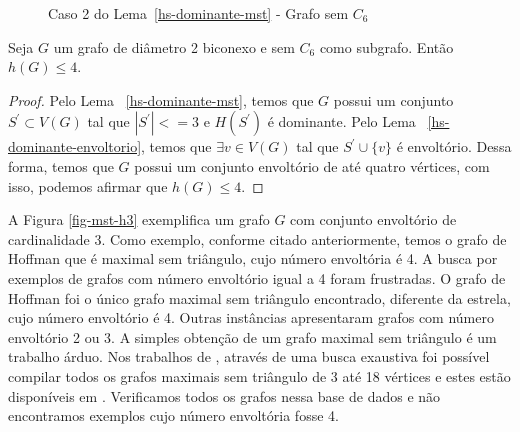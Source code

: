 \begin{figure}[h]
\centering
{}
\caption{Caso 2 do Lema~\ref{hs-dominante-mst} - Grafo sem $C_6$}
\label{fig-divisao-env-mst}
\end{figure}

\begin{coro}
    Seja $G$ um grafo de diâmetro 2 biconexo e sem $C_6$ como subgrafo. Então $h(G) \le 4$.
\label{teor-env-mst}
\end{coro}
\begin{proof}
    Pelo Lema ~\ref{hs-dominante-mst}, temos que $G$ possui um conjunto $S^\prime\subset V(G)$ tal que $|S^\prime|<=3$ e $H(S^\prime)$ é dominante. Pelo Lema ~\ref{hs-dominante-envoltorio}, temos que $\exists v \in V(G)$ tal que $S^\prime\cup\{v\}$ é envoltório. Dessa forma, temos que $G$ possui um conjunto envoltório de até quatro vértices, com isso, podemos afirmar que $h(G) \le 4$.
\end{proof}

A Figura \ref{fig-mst-h3} exemplifica um grafo $G$ com conjunto envoltório de cardinalidade 3. Como exemplo, conforme citado anteriormente, temos o grafo de Hoffman que é maximal sem triângulo, cujo número envoltória é 4. A busca por exemplos de grafos com número envoltório igual a 4 foram frustradas. O grafo de Hoffman foi o único grafo maximal sem triângulo encontrado, diferente da estrela,  cujo número envoltório é 4. Outras instâncias apresentaram grafos com número envoltório 2 ou 3. A simples obtenção de um grafo maximal sem triângulo é um trabalho árduo. Nos trabalhos de \cite{Brandt2000, BRUGMANN200951}, através de uma busca exaustiva foi possível compilar todos os grafos maximais sem triângulo de 3 até 18 vértices e estes estão disponíveis em \cite{hog2013}. Verificamos todos os grafos nessa base de dados e não encontramos exemplos cujo número envoltória fosse 4.


